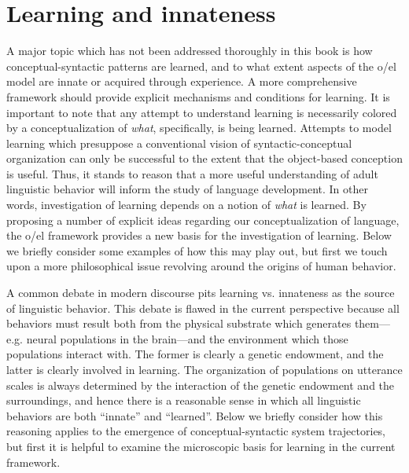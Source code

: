 \section{Learning and innateness}

A major topic which has not been addressed thoroughly in this book is how conceptual-syntactic patterns are learned, and to what extent aspects of the o/el model are innate or acquired through experience. A more comprehensive framework should provide explicit mechanisms and conditions for learning. It is important to note that any attempt to understand learning is necessarily colored by a conceptualization of \textit{what}, specifically, is being learned. Attempts to model learning which presuppose a conventional vision of syntactic-conceptual organization can only be successful to the extent that the object-based conception is useful. Thus, it stands to reason that a more useful understanding of adult linguistic behavior will inform the study of language development. In other words, investigation of learning depends on a notion of \textit{what} is learned. By proposing a number of explicit ideas regarding our conceptualization of language, the o/el framework provides a new basis for the investigation of learning. Below we briefly consider some examples of how this may play out, but first we touch upon a more philosophical issue revolving around the origins of human behavior.

A common debate in modern discourse pits learning vs. innateness as the source of linguistic behavior. This debate is flawed in the current perspective because all behaviors must result both from the physical substrate which generates them—e.g. neural populations in the brain—and the environment which those populations interact with. The former is clearly a genetic endowment, and the latter is clearly involved in learning. The organization of populations on utterance scales is always determined by the interaction of the genetic endowment and the surroundings, and hence there is a reasonable sense in which all linguistic behaviors are both “innate” and “learned”.  Below we briefly consider how this reasoning applies to the emergence of conceptual-syntactic system trajectories, but first it is helpful to examine the microscopic basis for learning in the current framework.


